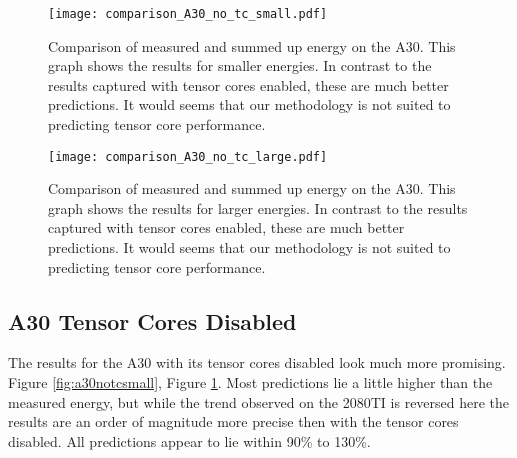 \documentclass[conference]{IEEEtran}
\begin{document}

\begin{figure}
    \texttt{[image: comparison\_A30\_no\_tc\_small.pdf]}
    \caption{Comparison of measured and summed up energy on the A30. This graph shows the results for smaller energies. In contrast to the results captured with tensor cores enabled, these are much better predictions. It would seems that our methodology is not suited to predicting tensor core performance.}
    \label{fig:a30notcsmall}
    \texttt{[image: comparison\_A30\_no\_tc\_large.pdf]}
    \caption{Comparison of measured and summed up energy on the A30. This graph shows the results for larger energies. In contrast to the results captured with tensor cores enabled, these are much better predictions. It would seems that our methodology is not suited to predicting tensor core performance.}
    \label{fig:a30notclarge}
\end{figure}

\subsection{A30 Tensor Cores Disabled}
The results for the A30 with its tensor cores disabled look much more promising. Figure \ref{fig:a30notcsmall}, Figure \ref{fig:a30notclarge}. Most predictions lie a little higher than the measured energy, but while the trend observed on the 2080TI is reversed here the results are an order of magnitude more precise then with the tensor cores disabled. All predictions appear to lie within 90\% to 130\%.
\end{document}
